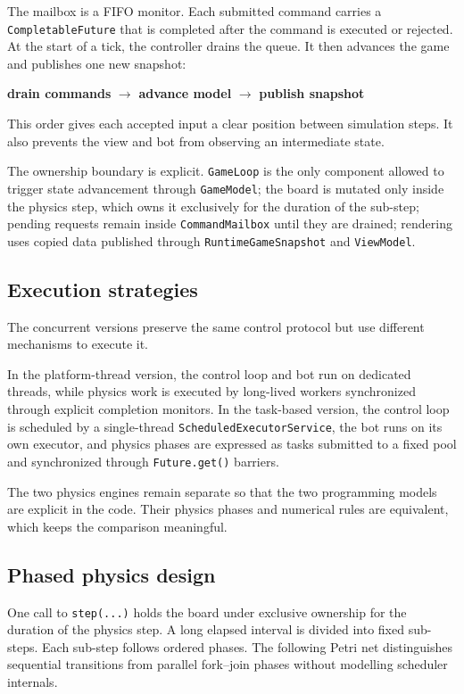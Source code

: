 The mailbox is a FIFO monitor. Each submitted command carries a
\texttt{CompletableFuture} that is completed after the command is executed or
rejected. At the start of a tick, the controller drains the queue. It then
advances the game and publishes one new snapshot:

\begin{center}
\textbf{drain commands} $\rightarrow$ \textbf{advance model}
$\rightarrow$ \textbf{publish snapshot}
\end{center}

This order gives each accepted input a clear position between simulation
steps. It also prevents the view and bot from observing an intermediate state.

The ownership boundary is explicit. \texttt{GameLoop} is the only component
allowed to trigger state advancement through \texttt{GameModel}; the board is
mutated only inside the physics step, which owns it exclusively for the
duration of the sub-step; pending requests remain inside
\texttt{CommandMailbox} until they are drained; rendering uses copied data
published through \texttt{RuntimeGameSnapshot} and \texttt{ViewModel}.

\subsection{Execution strategies}

The concurrent versions preserve the same control protocol but use different
mechanisms to execute it.

In the platform-thread version, the control loop and bot run on dedicated
threads, while physics work is executed by long-lived workers synchronized
through explicit completion monitors. In the task-based version, the control
loop is scheduled by a single-thread \texttt{ScheduledExecutorService}, the
bot runs on its own executor, and physics phases are expressed as tasks
submitted to a fixed pool and synchronized through
\texttt{Future.get()} barriers.

The two physics engines remain separate so that the two programming models are
explicit in the code. Their physics phases and numerical rules are equivalent,
which keeps the comparison meaningful.

\clearpage
\subsection{Phased physics design}

One call to \texttt{step(...)} holds the board under exclusive ownership for
the duration of the physics step. A long elapsed interval is divided into fixed
sub-steps. Each sub-step follows ordered phases. The following Petri net distinguishes sequential transitions
from parallel fork--join phases without modelling scheduler internals.

